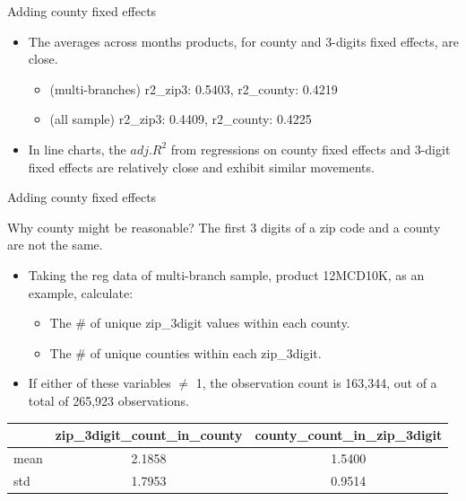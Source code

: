 \documentclass{beamer}
\begin{document}
\begin{frame}{Adding county fixed effects}
    \begin{itemize} 
        \item The averages across months products, for county and 3-digits fixed effects, are close.
        \begin{itemize}
            \item (multi-branches) r2\_zip3: 0.5403, r2\_county: 0.4219
            \item (all sample) r2\_zip3: 0.4409, r2\_county: 0.4225
        \end{itemize}
     \item In line charts, the $adj.R^2$ from regressions on county fixed effects and 3-digit fixed effects are relatively close and exhibit similar movements.
    \end{itemize}
\end{frame}


\begin{frame}{Adding county fixed effects}

Why county might be reasonable? The first 3 digits of a zip code and a county are not the same.

\vspace{1em}

\begin{itemize}
    \item Taking the reg data of multi-branch sample, product 12MCD10K, as an example, calculate:
    \begin{itemize}
        \item The \# of unique zip\_3digit values within each county.
        \item The \# of unique counties within each zip\_3digit.
    \end{itemize}
    \item If either of these variables $\neq$ 1, the observation count is 163,344, out of a total of 265,923 observations.
\end{itemize}

\begin{table}[]
        \centering
        \footnotesize
        \begin{tabular}{lcc}
            \hline
            & zip\_3digit\_count\_in\_county & county\_count\_in\_zip\_3digit \\
            \hline
            mean & 2.1858 & 1.5400 \\
            std & 1.7953 & 0.9514 \\
            \hline
        \end{tabular}
    \end{table}
\end{frame}
\end{document}
